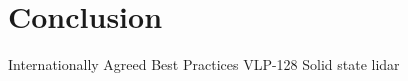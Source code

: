 \let\textcircled=\pgftextcircled


\chapter{Conclusion}
\label{chap:conclusion}

Internationally Agreed Best Practices
VLP-128 
Solid state lidar 


%
%
